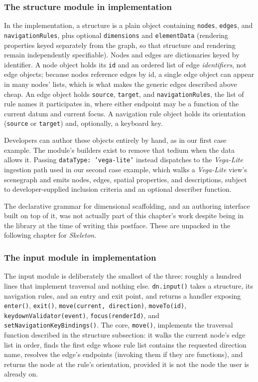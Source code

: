 \documentclass[12pt]{cmuthesis}
\begin{document}
\subsubsection{The structure module in implementation}

In the implementation, a structure is a plain object containing \texttt{nodes}, \texttt{edges}, and \texttt{navigationRules}, plus optional \texttt{dimensions} and \texttt{elementData} (rendering properties keyed separately from the graph, so that structure and rendering remain independently specifiable). Nodes and edges are dictionaries keyed by identifier. A node object holds its \texttt{id} and an ordered list of edge \textit{identifiers}, not edge objects; because nodes reference edges by id, a single edge object can appear in many nodes' lists, which is what makes the generic edges described above cheap. An edge object holds \texttt{source}, \texttt{target}, and \texttt{navigationRules}, the list of rule names it participates in, where either endpoint may be a function of the current datum and current focus. A navigation rule object holds its orientation (\texttt{source} or \texttt{target}) and, optionally, a keyboard key.

Developers can author these objects entirely by hand, as in our first case example. The module's builders exist to remove that tedium when the data allows it. Passing \texttt{dataType: 'vega-lite'} instead dispatches to the \textit{Vega-Lite} ingestion path used in our second case example, which walks a \textit{Vega-Lite} view's scenegraph and emits nodes, edges, spatial properties, and descriptions, subject to developer-supplied inclusion criteria and an optional describer function.

The declarative grammar for dimensional scaffolding, and an authoring interface built on top of it, was not actually part of this chapter's work despite being in the library at the time of writing this postface. These are unpacked in the following chapter for \textit{Skeleton}.

\subsubsection{The input module in implementation}

The input module is deliberately the smallest of the three: roughly a hundred lines that implement traversal and nothing else. \texttt{dn.input()} takes a structure, its navigation rules, and an entry and exit point, and returns a handler exposing \texttt{enter()}, \texttt{exit()}, \texttt{move(current, direction)}, \texttt{moveTo(id)}, \texttt{keydownValidator(event)}, \texttt{focus(renderId)}, and \texttt{setNavigationKeyBindings()}. The core, \texttt{move()}, implements the traversal function described in the structure subsection: it walks the current node's edge list in order, finds the first edge whose rule list contains the requested direction name, resolves the edge's endpoints (invoking them if they are functions), and returns the node at the rule's orientation, provided it is not the node the user is already on.
\end{document}
